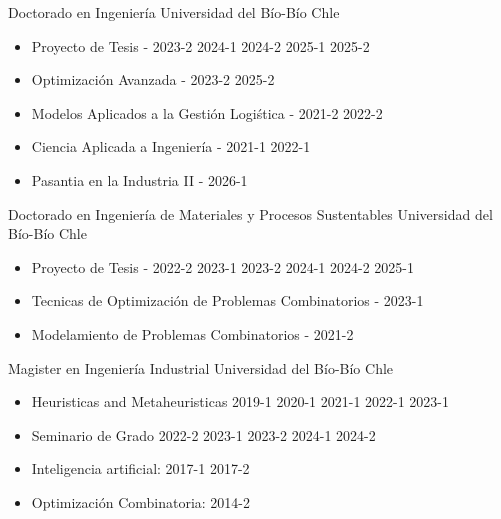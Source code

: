{Doctorado en Ingenier\'ia}
{Universidad del B\'io-B\'io}
{Chle}
{}
{\begin{itemize}
\item Proyecto de Tesis - 2023-2 2024-1 2024-2 2025-1 2025-2
\item Optimizaci\'on Avanzada - 2023-2 2025-2
\item Modelos Aplicados a la Gesti\'on Logi\'stica - 2021-2 2022-2
\item Ciencia Aplicada a Ingenier\'ia - 2021-1 2022-1
\item Pasantia en la Industria II - 2026-1
\end{itemize}}

{Doctorado en Ingenier\'ia de Materiales y Procesos Sustentables}
{Universidad del B\'io-B\'io}
{Chle}
{}
{\begin{itemize}
\item Proyecto de Tesis - 2022-2 2023-1 2023-2 2024-1 2024-2 2025-1
\item Tecnicas de Optimizaci\'on de Problemas Combinatorios - 2023-1
\item Modelamiento de Problemas Combinatorios - 2021-2
\end{itemize}}

{Magister en Ingenier\'ia Industrial}
{Universidad del B\'io-B\'io}
{Chle}
{}
{\begin{itemize}
\item Heuristicas and Metaheuristicas 2019-1 2020-1 2021-1 2022-1 2023-1
\item Seminario de Grado 2022-2 2023-1 2023-2 2024-1 2024-2
\item Inteligencia artificial: 2017-1 2017-2
\item Optimizaci\'on Combinatoria: 2014-2
\end{itemize}}

